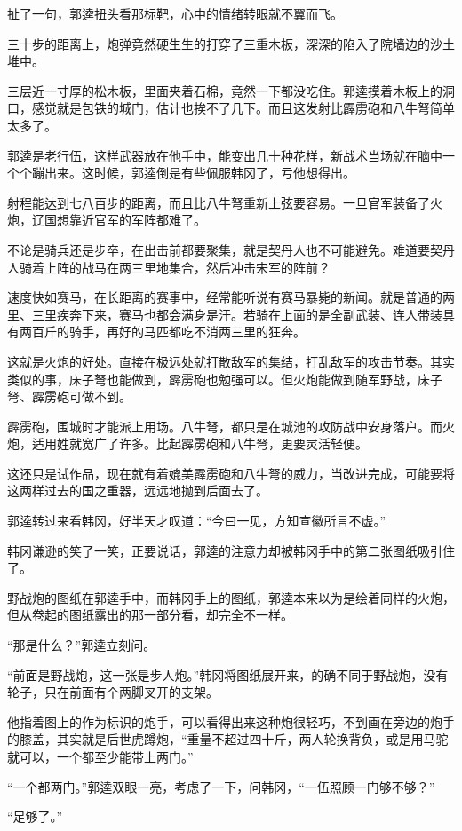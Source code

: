 扯了一句，郭逵扭头看那标靶，心中的情绪转眼就不翼而飞。

三十步的距离上，炮弹竟然硬生生的打穿了三重木板，深深的陷入了院墙边的沙土堆中。

三层近一寸厚的松木板，里面夹着石棉，竟然一下都没吃住。郭逵摸着木板上的洞口，感觉就是包铁的城门，估计也挨不了几下。而且这发射比霹雳砲和八牛弩简单太多了。

郭逵是老行伍，这样武器放在他手中，能变出几十种花样，新战术当场就在脑中一个个蹦出来。这时候，郭逵倒是有些佩服韩冈了，亏他想得出。

射程能达到七八百步的距离，而且比八牛弩重新上弦要容易。一旦官军装备了火炮，辽国想靠近官军的军阵都难了。

不论是骑兵还是步卒，在出击前都要聚集，就是契丹人也不可能避免。难道要契丹人骑着上阵的战马在两三里地集合，然后冲击宋军的阵前？

速度快如赛马，在长距离的赛事中，经常能听说有赛马暴毙的新闻。就是普通的两里、三里疾奔下来，赛马也都会满身是汗。若骑在上面的是全副武装、连人带装具有两百斤的骑手，再好的马匹都吃不消两三里的狂奔。

这就是火炮的好处。直接在极远处就打散敌军的集结，打乱敌军的攻击节奏。其实类似的事，床子弩也能做到，霹雳砲也勉强可以。但火炮能做到随军野战，床子弩、霹雳砲可做不到。

霹雳砲，围城时才能派上用场。八牛弩，都只是在城池的攻防战中安身落户。而火炮，适用姓就宽广了许多。比起霹雳砲和八牛弩，更要灵活轻便。

这还只是试作品，现在就有着媲美霹雳砲和八牛弩的威力，当改进完成，可能要将这两样过去的国之重器，远远地抛到后面去了。

郭逵转过来看韩冈，好半天才叹道：“今曰一见，方知宣徽所言不虚。”

韩冈谦逊的笑了一笑，正要说话，郭逵的注意力却被韩冈手中的第二张图纸吸引住了。

野战炮的图纸在郭逵手中，而韩冈手上的图纸，郭逵本来以为是绘着同样的火炮，但从卷起的图纸露出的那一部分看，却完全不一样。

“那是什么？”郭逵立刻问。

“前面是野战炮，这一张是步人炮。”韩冈将图纸展开来，的确不同于野战炮，没有轮子，只在前面有个两脚叉开的支架。

他指着图上的作为标识的炮手，可以看得出来这种炮很轻巧，不到画在旁边的炮手的膝盖，其实就是后世虎蹲炮，“重量不超过四十斤，两人轮换背负，或是用马驼就可以，一个都至少能带上两门。”

“一个都两门。”郭逵双眼一亮，考虑了一下，问韩冈，“一伍照顾一门够不够？”

“足够了。”

